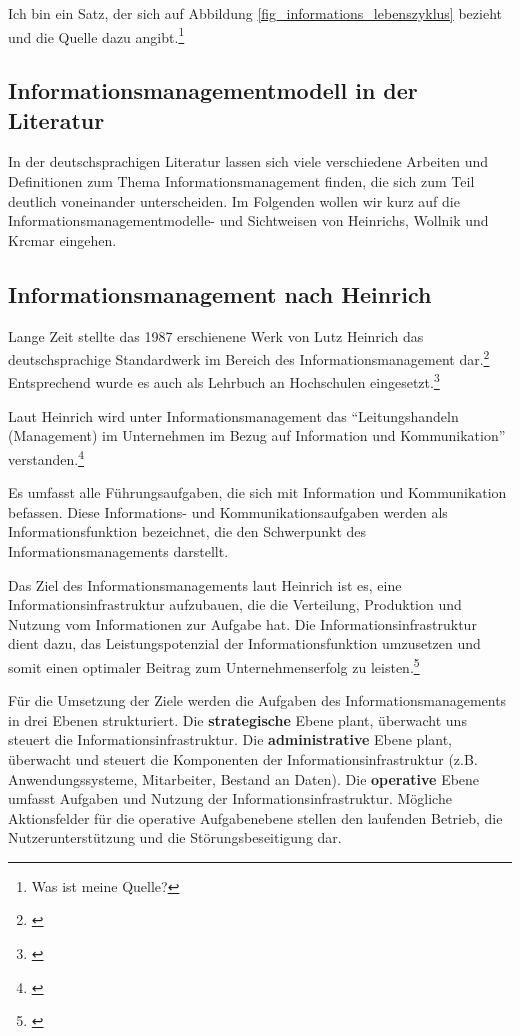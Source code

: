 Ich bin ein Satz, der sich auf Abbildung \ref{fig_informations_lebenszyklus} bezieht und die Quelle dazu angibt.\footnote{Was ist meine Quelle?}

\subsection{Informationsmanagementmodell in der Literatur}
In der deutschsprachigen Literatur lassen sich viele verschiedene Arbeiten und Definitionen zum Thema Informationsmanagement finden, die sich zum Teil deutlich voneinander unterscheiden. Im Folgenden wollen wir kurz auf die Informationsmanagementmodelle- und Sichtweisen von Heinrichs, Wollnik und Krcmar eingehen.

\subsection{Informationsmanagement nach Heinrich}

Lange Zeit stellte das 1987 erschienene Werk von Lutz Heinrich das deutschsprachige Standardwerk im Bereich des Informationsmanagement dar.\footnote{\cite{heinrich_informationsmanagement_2005}} Entsprechend wurde es auch als Lehrbuch an Hochschulen eingesetzt.\footnote{\cite{heinrich_inm_2002}}

Laut Heinrich wird unter Informationsmanagement das “Leitungshandeln (Management) im Unternehmen im Bezug auf Information und Kommunikation” verstanden.\footnote{\cite{heinrich_informationsmanagement_2005}}

Es umfasst alle Führungsaufgaben, die sich mit Information und Kommunikation befassen. Diese Informations- und Kommunikationsaufgaben werden als Informationsfunktion bezeichnet, die den Schwerpunkt des Informationsmanagements darstellt. 

Das Ziel des Informationsmanagements laut Heinrich ist es, eine Informationsinfrastruktur aufzubauen, die die Verteilung, Produktion und Nutzung vom Informationen zur Aufgabe hat. Die Informationsinfrastruktur dient dazu, das Leistungspotenzial der Informationsfunktion umzusetzen und somit einen optimaler Beitrag zum Unternehmenserfolg zu leisten.\footnote{\cite{heinrich_inm_2002}}

Für die Umsetzung der Ziele werden die Aufgaben des Informationsmanagements in drei Ebenen strukturiert.
Die \textbf{strategische} Ebene plant, überwacht uns steuert die Informationsinfrastruktur.
Die \textbf{administrative} Ebene plant, überwacht und steuert die Komponenten der Informationsinfrastruktur (z.B. Anwendungssysteme, Mitarbeiter, Bestand an Daten).
Die \textbf{operative} Ebene umfasst Aufgaben und Nutzung der Informationsinfrastruktur. Mögliche Aktionsfelder für die operative Aufgabenebene stellen den laufenden Betrieb, die Nutzerunterstützung und die Störungsbeseitigung dar.

